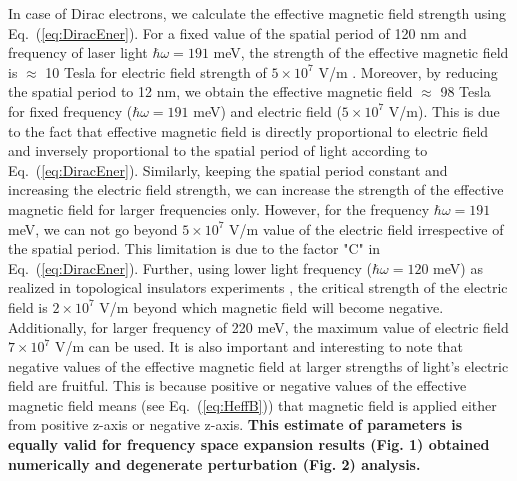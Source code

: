 \documentclass[aps,prl,showpacs,twocolumn,amsmath,amssymb,superscriptaddress]{revtex4-2}
\begin{document}
In case of Dirac electrons, we calculate the effective magnetic field strength using Eq.~(\ref{eq:DiracEner}). For a fixed value of the spatial period of 120 nm and frequency of laser light $\hbar \omega = 191$ meV, the strength of the effective magnetic field is $\approx$ 10 Tesla for electric field strength of $5 \times 10^7$ V/m \cite{JWM}. Moreover, by reducing the spatial period to 12 nm, we obtain the effective magnetic field $\approx$ 98 Tesla for fixed frequency ($\hbar \omega = 191 $ meV) and electric field ($5 \times 10^7$ V/m). This is due to the fact that effective magnetic field is directly proportional to electric field and inversely proportional to the spatial period of light according to Eq.~(\ref{eq:DiracEner}). Similarly, keeping the spatial period constant and increasing the electric field strength, we can increase the strength of the effective magnetic field for larger frequencies only. However, for the frequency $\hbar \omega = 191$ meV, we can not go beyond $5 \times 10^7$ V/m value of the electric field irrespective of the spatial period. This limitation is due to the factor "C" in Eq.~(\ref{eq:DiracEner}). Further, using lower light frequency ($\hbar \omega = 120$ meV) as realized in topological insulators experiments \cite{YHW}, the critical strength of the electric field is $2 \times 10^7$ V/m beyond which magnetic field will become negative. Additionally, for larger frequency of 220 meV, the maximum value of electric field $7 \times 10^7$ V/m can be used. It is also important and interesting to note that negative values of the effective magnetic field at larger strengths of light's electric field are fruitful. This is because positive or negative values of the effective magnetic field means (see Eq.~(\ref{eq:HeffB})) that magnetic field is applied either from positive z-axis or negative z-axis. \textbf{This estimate of parameters is equally valid for frequency space expansion results (Fig. 1) obtained numerically and degenerate perturbation (Fig. 2) analysis.}
\end{document}
